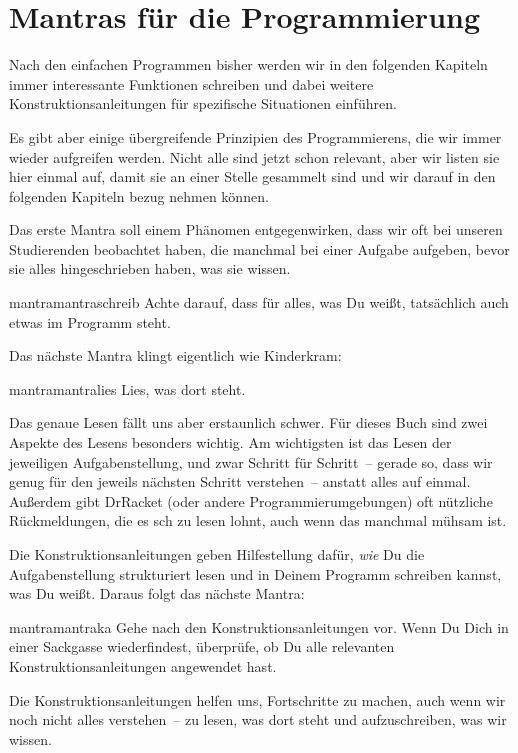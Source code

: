 \section{Mantras für die Programmierung}

Nach den einfachen Programmen bisher werden wir in den
folgenden Kapiteln immer interessante Funktionen schreiben und dabei
weitere Konstruktionsanleitungen für spezifische Situationen
einführen.

Es gibt aber einige übergreifende Prinzipien des Programmierens, die
wir immer wieder aufgreifen werden.  Nicht alle sind jetzt schon
relevant, aber wir listen sie hier einmal auf, damit sie an einer
Stelle gesammelt sind und wir darauf in den folgenden Kapiteln bezug
nehmen können.

Das erste Mantra soll einem Phänomen entgegenwirken, dass wir oft bei
unseren Studierenden beobachtet haben, die manchmal bei einer Aufgabe
aufgeben, bevor sie alles hingeschrieben haben, was sie wissen.
%
\begin{restatable}{mantra}{mantraschreib}
  \label{mantra:schreib}
  Achte darauf, dass für alles, was Du weißt, tatsächlich auch etwas
  im Programm steht.
\end{restatable}
% 
\noindent Das nächste Mantra klingt eigentlich wie Kinderkram:
%
\begin{restatable}{mantra}{mantralies}
  \label{mantra:lies}
  Lies, was dort steht.
\end{restatable}
% 
\noindent Das genaue Lesen fällt uns aber erstaunlich schwer.  Für dieses Buch
sind zwei Aspekte des Lesens besonders wichtig.  Am wichtigsten ist
das Lesen der jeweiligen Aufgabenstellung, und zwar Schritt für
Schritt~-- gerade so, dass wir genug für den jeweils nächsten Schritt
verstehen~-- anstatt alles auf einmal. Außerdem gibt DrRacket (oder
andere Programmierumgebungen) oft nützliche Rückmeldungen, die es sch
zu lesen lohnt, auch wenn das manchmal mühsam ist.

Die Konstruktionsanleitungen geben Hilfestellung dafür, \emph{wie} Du
die Aufgabenstellung strukturiert lesen und in Deinem Programm
schreiben kannst, was Du weißt.  Daraus folgt das nächste Mantra:
%
\begin{restatable}{mantra}{mantraka}
  \label{mantra:ka}
  Gehe nach den Konstruktionsanleitungen vor.  Wenn Du Dich in einer
  Sackgasse wiederfindest, überprüfe, ob Du alle relevanten
  Konstruktionsanleitungen angewendet hast.
\end{restatable}
%
\noindent Die Konstruktionsanleitungen helfen uns, Fortschritte zu machen, auch
wenn wir noch nicht alles verstehen~-- zu lesen, was dort steht und
aufzuschreiben, was wir wissen.


